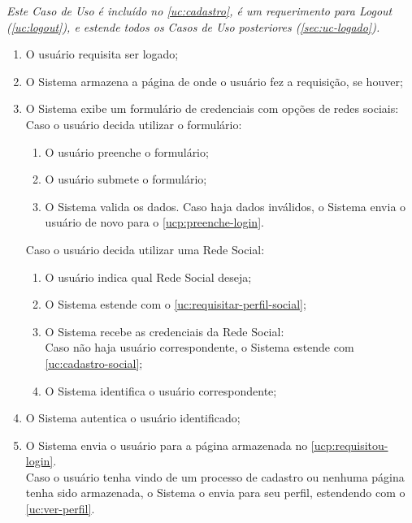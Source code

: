 \documentclass[12pt,a4paper,twoside,hyphens,english,brazil]{abntex2}
\begin{document}
{%
\emph{Este Caso de Uso é incluído no \ref{uc:cadastro}, é um requerimento para Logout (\ref{uc:logout}), e estende todos os Casos de Uso posteriores (\ref{sec:uc-logado}).}
\begin{enumerate}[itemsep=-1ex,topsep=-1ex]
	\item O usuário requisita ser logado;
	\item O Sistema armazena a página de onde o usuário fez a requisição, se houver; \label{ucp:requisitou-login}
	\item O Sistema exibe um formulário de credenciais com opções de redes sociais: \label{ucp:preenche-login}
		\\Caso o usuário decida utilizar o formulário:
			\begin{enumerate}[itemsep=-1ex,topsep=-1ex]
				\item O usuário preenche o formulário;
				\item O usuário submete o formulário;
				\item O Sistema valida os dados. Caso haja dados inválidos, o Sistema envia o usuário de novo para o \autoref{ucp:preenche-login}.
			\end{enumerate}
		Caso o usuário decida utilizar uma Rede Social:
			\begin{enumerate}[itemsep=-1ex,topsep=-1ex]
				\item O usuário indica qual Rede Social deseja;
				\item O Sistema estende com o \ref{uc:requisitar-perfil-social};
				\item O Sistema recebe as credenciais da Rede Social:
					\\Caso não haja usuário correspondente, o Sistema estende com \ref{uc:cadastro-social};
				\item O Sistema identifica o usuário correspondente;
			\end{enumerate}
	\item O Sistema autentica o usuário identificado;
	\item O Sistema envia o usuário para a página armazenada no \autoref{ucp:requisitou-login}.
		\\Caso o usuário tenha vindo de um processo de cadastro ou nenhuma página tenha sido armazenada, o Sistema o envia para seu perfil, estendendo com o \ref{uc:ver-perfil}.
\end{enumerate}

}
\end{document}
